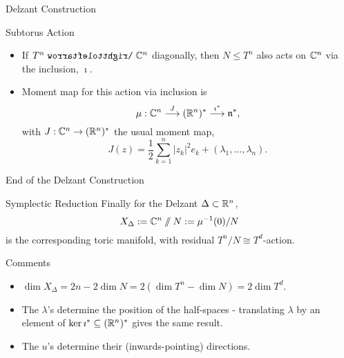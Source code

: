 \begin{frame}{Delzant Construction}
    \begin{block}{Subtorus Action}
        \begin{itemize}
            \item If $T^{n} \acts \CC^{n}$ diagonally, then $N \leq T^{n}$ also acts on $\mathbb{C}^{n}$ via the inclusion, $\imath$.
            \item Moment map for this action via inclusion is
            $$ \mu : \mathbb{C}^{n} \overset{J}{\longrightarrow} (\mathbb{R}^{n})^{\ast} \overset{\imath^{\ast}}{\longrightarrow} \mathfrak{n}^{\ast}, $$
            with $J : \mathbb{C}^{n} \rightarrow (\mathbb{R}^{n})^{\ast}$ the usual moment map,
            $$ J(z) = \frac{1}{2} \sum_{k=1}^{n} |z_{k}|^{2}e_{k} + (\lambda_{1}, \ldots, \lambda_{n}). $$
        \end{itemize}
    \end{block}
\end{frame}

\begin{frame}{End of the Delzant Construction}
    \begin{block}{Symplectic Reduction}
        Finally for the Delzant $\Delta \subset \mathbb{R}^{n}$, 
        $$ X_{\Delta} := \mathbb{C}^{n} \sslash N := \mu^{-1}(0) / N $$
        is the corresponding toric manifold, with residual $T^{n} / N \cong T^{d}$-action.
    \end{block}
    \begin{block}{Comments}
        \begin{itemize}
        \item $\dim X_{\Delta} = 2n - 2 \dim N = 2(\dim T^{n} - \dim N) = 2 \dim T^{d}$.
        \item The $\lambda$'s determine the position of the half-spaces - translating $\lambda$ by an element of $\ker \imath^{\ast} \subseteq (\mathbb{R}^{n})^{\ast}$ gives the same result.
        \item The $u$'s determine their (inwards-pointing) directions.
        \end{itemize}
    \end{block}
\end{frame}

